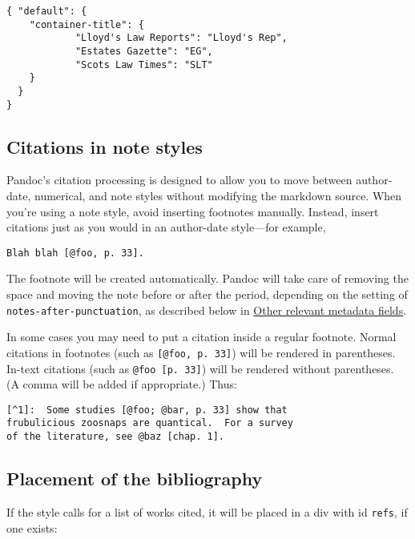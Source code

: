\documentclass[
  a4paper,
]{article}
\begin{document}
\begin{verbatim}
{ "default": {
    "container-title": {
            "Lloyd's Law Reports": "Lloyd's Rep",
            "Estates Gazette": "EG",
            "Scots Law Times": "SLT"
    }
  }
}
\end{verbatim}

\hypertarget{citations-in-note-styles}{%
\subsection{Citations in note styles}\label{citations-in-note-styles}}

Pandoc's citation processing is designed to allow you to move between
author-date, numerical, and note styles without modifying the markdown
source. When you're using a note style, avoid inserting footnotes
manually. Instead, insert citations just as you would in an author-date
style---for example,

\begin{verbatim}
Blah blah [@foo, p. 33].
\end{verbatim}

The footnote will be created automatically. Pandoc will take care of
removing the space and moving the note before or after the period,
depending on the setting of \texttt{notes-after-punctuation}, as
described below in
\protect\hyperlink{other-relevant-metadata-fields}{Other relevant
metadata fields}.

In some cases you may need to put a citation inside a regular footnote.
Normal citations in footnotes (such as \texttt{{[}@foo,\ p.\ 33{]}})
will be rendered in parentheses. In-text citations (such as
\texttt{@foo\ {[}p.\ 33{]}}) will be rendered without parentheses. (A
comma will be added if appropriate.) Thus:

\begin{verbatim}
[^1]:  Some studies [@foo; @bar, p. 33] show that
frubulicious zoosnaps are quantical.  For a survey
of the literature, see @baz [chap. 1].
\end{verbatim}

\hypertarget{placement-of-the-bibliography}{%
\subsection{Placement of the
bibliography}\label{placement-of-the-bibliography}}

If the style calls for a list of works cited, it will be placed in a div
with id \texttt{refs}, if one exists:
\end{document}
